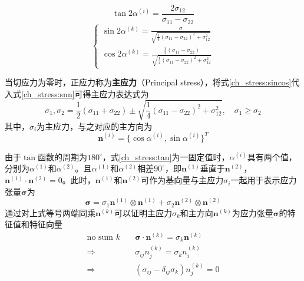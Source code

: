 \begin{equation}\label{ch_stress:tan}
\tan 2 \alpha^{(i)} = \frac{2\sigma_{12}}{\sigma_{11} - \sigma_{22}}
\end{equation}
\begin{equation}\label{ch_stress:sincos}
    \begin{cases}
    \sin 2 \alpha^{(k)} = \frac{\sigma}{\sqrt{\frac{1}{4}(\sigma_{11}-\sigma_{22})^2 + \sigma_{12}^2}}\\
    \cos 2 \alpha^{(k)} = \frac{\frac{1}{2}(\sigma_{11}-\sigma_{22})}{\sqrt{\frac{1}{4}(\sigma_{11}-\sigma_{22})^2 + \sigma_{12}^2}}
    \end{cases}
\end{equation} \par
当切应力为零时，正应力称为\textbf{主应力}（Principal stress），将式\eqref{ch_stress:sincos}代入式\eqref{ch_stress:snn}可得主应力表达式为
\begin{equation}
    \sigma_1, \sigma_2 = \frac{1}{2}(\sigma_{11}+\sigma_{22})\pm \sqrt{\frac{1}{4}(\sigma_{11}-\sigma_{22})^2 + \sigma_{12}^2},\quad \sigma_{1}\ge\sigma_{2}
\end{equation}
其中，$\sigma_i$为主应力，与之对应的主方向为
\begin{equation}
    \boldsymbol n^{(i)} = \{ \cos \alpha^{(i)}, \sin \alpha^{(i)} \}^T
\end{equation}\par
由于$\tan$函数的周期为$180^{\circ}$，式\eqref{ch_stress:tan}为一固定值时，$\alpha^{(i)}$具有两个值，分别为$\alpha^{(1)}$和$\alpha^{(2)}$。且$\alpha^{(1)}$和$\alpha^{(2)}$相差$90^{\circ}$，即$\boldsymbol n^{(1)}$垂直于$\boldsymbol n^{(2)}$，$\boldsymbol n^{(1)}\cdot \boldsymbol n^{(2)}=0$。此时，$\boldsymbol n^{(1)}$和$\boldsymbol n^{(2)}$可作为基向量与主应力$\sigma_i$一起用于表示应力张量$\boldsymbol \sigma$为
\begin{equation}
\boldsymbol \sigma = \sigma_1 \boldsymbol n^{(1)} \otimes \boldsymbol n^{(1)} + \sigma_2 \boldsymbol n^{(2)} \otimes \boldsymbol n^{(2)}
\end{equation}
通过对上式等号两端同乘$\boldsymbol n^{(k)}$可以证明主应力$\sigma_k$和主方向$\boldsymbol n^{(k)}$为应力张量$\boldsymbol \sigma$的特征值和特征向量
\begin{subequations}
\begin{align}
    \text{no sum } k \quad & \boldsymbol \sigma \cdot \boldsymbol n^{(k)} = \sigma_k \boldsymbol n^{(k)} \\
    \Rightarrow & \sigma_{ij} n_j^{(k)} = \sigma_k n_i^{(k)} \\
    \Rightarrow & (\sigma_{ij}-\delta_{ij}\sigma_k) n_j^{(k)} = 0 \label{ch_stress:eig}
\end{align}
\end{subequations}
